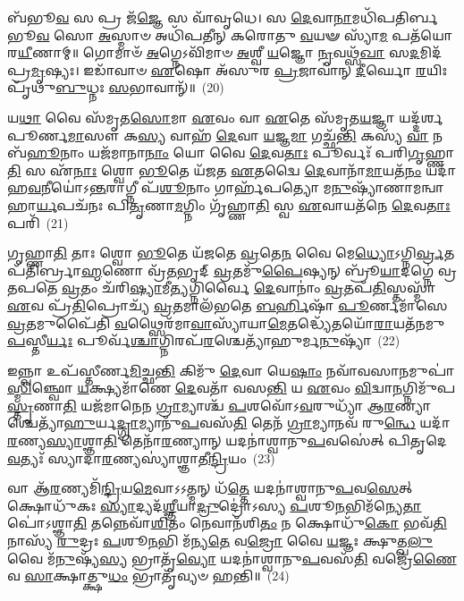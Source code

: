 𑌬᳴𑌭𑍂\-\ul{𑌵} 𑌸 𑌪𑍍𑌰 𑌜᳴\-\ul{𑌜𑍍𑌞𑍇} 𑌸 𑌵𑌾᳴𑌵𑍃𑌧𑍇। 𑌸 \ul{𑌦𑍇}\-𑌵𑌾\-\ul{𑌨𑌾}\-𑌮𑌧𑌿᳴𑌪𑌤𑌿𑌰𑍍𑌬𑌭𑍂\-\ul{𑌵} 𑌸𑍋 \ul{𑌅}\-𑌸𑍍𑌮𑌾𑍞 𑌅𑌧𑌿᳴𑌪𑌤𑍀𑌨𑍍 𑌕𑌰𑍋𑌤𑍁 \ul{𑌵}\-𑌯𑍟 𑌸𑍍𑌯𑌾᳴\-\ul{𑌮} 𑌪𑌤᳴𑌯𑍋 𑌰\-\ul{𑌯𑍀}\-𑌣𑌾𑌮𑍍॥ 𑌗𑍋𑌮𑌾𑍞᳴ \ul{𑌅}\-𑌗𑍍𑌨𑍇\-𑌽𑌵𑌿᳴𑌮𑌾𑍞 \ul{𑌅}\-𑌶𑍍𑌵𑍀 \ul{𑌯}\-𑌜𑍍𑌞𑍋 \ul{𑌨𑍃}\-𑌵𑌥𑍍𑌸᳴\-\ul{𑌖𑌾} 𑌸\-\ul{𑌦}\-𑌮𑌿𑌦᳴𑌪𑍍𑌰\-\ul{𑌮𑍃}\-𑌷𑍍𑌯𑌃। 𑌇𑌡𑌾᳴𑌵𑌾𑍞 \ul{𑌏}\-𑌷𑍋 𑌅᳴𑌸𑍁𑌰 \ul{𑌪𑍍𑌰}\-𑌜𑌾𑌵𑌾॑𑌨𑍍 \ul{𑌦𑍀}\-𑌰𑍍𑌘𑍋 \ul{𑌰}\-𑌯𑌿𑌃 𑌪𑍃᳴𑌥𑍁\-\ul{𑌬𑍁}\-𑌧𑍍𑌨𑌃 \ul{𑌸}\-𑌭𑌾𑌵𑌾𑌨𑍍᳴॥~(20)

{\anuvakamend[{\-\ul{𑌦𑍍𑌵𑌿}\-𑌷𑍍𑌮𑌃 \ul{𑌸𑍁}\-𑌵𑍀\-\ul{𑌰𑍍𑌯}\-\-\ul{𑍞} 𑌸 𑌆 𑌪𑌞𑍍𑌚᳴𑌤𑍍𑌰𑌿𑍞𑌶𑌚𑍍𑌚}]}%

𑌯\-\ul{𑌥𑌾} 𑌵𑍈 𑌸᳴𑌮𑍃𑌤\-\ul{𑌸𑍋}\-𑌮𑌾 \ul{𑌏}\-𑌵𑌂 𑌵𑌾 \ul{𑌏}\-𑌤𑍇 𑌸᳴𑌮𑍃𑌤\-\ul{𑌯}\-𑌜𑍍𑌞𑌾 𑌯𑌦𑍍𑌦᳴𑌰𑍍\mbox{}𑌶𑌪𑍂𑌰𑍍𑌣\-\ul{𑌮𑌾}\-𑌸𑍗 𑌕\-\ul{𑌸𑍍𑌯} 𑌵𑌾𑌹᳴ \ul{𑌦𑍇}\-𑌵𑌾 \ul{𑌯}\-𑌜𑍍𑌞\-\ul{𑌮𑌾} 𑌗𑌚𑍍𑌛᳴\-\ul{𑌨𑍍𑌤𑌿} 𑌕𑌸𑍍𑌯᳴ \ul{𑌵𑌾} 𑌨 𑌬᳴\-\ul{𑌹𑍂}\-𑌨𑌾𑌂 𑌯𑌜᳴𑌮𑌾𑌨𑌾\-\ul{𑌨𑌾𑌂} 𑌯𑍋 𑌵𑍈 \ul{𑌦𑍇}\-𑌵\-\ul{𑌤𑌾𑌃} 𑌪𑍂𑌰𑍍𑌵𑌃᳴ 𑌪𑌰𑌿\-\ul{𑌗𑍃}\-𑌹𑍍𑌣𑌾\-\ul{𑌤𑌿} 𑌸 𑌏᳴\-\ul{𑌨𑌾𑌃} 𑌶𑍍𑌵𑍋 \ul{𑌭𑍂}\-𑌤𑍇 𑌯᳴𑌜𑌤 \ul{𑌏}\-𑌤𑌦𑍍𑌵𑍈 \ul{𑌦𑍇}\-𑌵𑌾𑌨𑌾᳴\-\ul{𑌮𑌾}\-𑌯𑌤᳴\-\ul{𑌨𑌂} 𑌯𑌦𑌾᳴𑌹\-\ul{𑌵}\-𑌨𑍀𑌯𑍋॑\-𑌽\-\ul{𑌨𑍍𑌤}\-𑌰𑌾𑌗𑍍𑌨𑍀 𑌪᳴\-\ul{𑌶𑍂}\-𑌨𑌾𑌂 𑌗𑌾𑌰𑍍\mbox{}𑌹᳴𑌪𑌤𑍍𑌯𑍋 𑌮\-\ul{𑌨𑍁}\-𑌷𑍍𑌯𑌾᳴𑌣𑌾𑌮𑌨𑍍𑌵𑌾𑌹𑌾\-\ul{𑌰𑍍𑌯}\-𑌪𑌚᳴𑌨𑌃 𑌪𑌿\-\ul{𑌤𑍃}\-𑌣𑌾\-\ul{𑌮}\-𑌗𑍍𑌨𑌿𑌂 𑌗𑍃᳴𑌹𑍍𑌣𑌾\-\ul{𑌤𑌿} 𑌸𑍍𑌵 \ul{𑌏}\-𑌵𑌾𑌯𑌤᳴𑌨𑍇 \ul{𑌦𑍇}\-𑌵\-\ul{𑌤𑌾𑌃} 𑌪𑌰𑌿᳴~(21)

𑌗𑍃𑌹𑍍𑌣𑌾\-\ul{𑌤𑌿} 𑌤𑌾𑌃 𑌶𑍍𑌵𑍋 \ul{𑌭𑍂}\-𑌤𑍇 𑌯᳴𑌜𑌤𑍇 \ul{𑌵𑍍𑌰}\-𑌤𑍇\-\ul{𑌨} 𑌵𑍈 𑌮𑍇\-\ul{𑌧𑍍𑌯𑍋}\-\-𑌽𑌗𑍍𑌨𑌿\-\ul{𑌰𑍍𑌵𑍍𑌰}\-𑌤𑌪᳴𑌤𑌿𑌰𑍍𑌬𑍍𑌰𑌾\-\ul{𑌹𑍍𑌮}\-𑌣𑍋 𑌵𑍍𑌰᳴\-\ul{𑌤}\-𑌭𑍃𑌦𑍍 \ul{𑌵𑍍𑌰}\-𑌤𑌮𑍁᳴\-\ul{𑌪𑍈}\-𑌷𑍍𑌯𑌨𑍍 𑌬𑍍𑌰𑍂᳴\-\ul{𑌯𑌾}\-𑌦𑌗𑍍𑌨𑍇॑ 𑌵𑍍𑌰𑌤𑌪𑌤𑍇 \ul{𑌵𑍍𑌰}\-𑌤𑌂 𑌚᳴𑌰𑌿\-\ul{𑌷𑍍𑌯𑌾}\-𑌮𑍀\-\ul{𑌤𑍍𑌯}\-𑌗𑍍𑌨𑌿𑌰𑍍𑌵𑍈 \ul{𑌦𑍇}\-𑌵𑌾𑌨𑌾𑌂॑ \ul{𑌵𑍍𑌰}\-𑌤𑌪᳴\-\ul{𑌤𑌿}\-𑌸𑍍𑌤𑌸𑍍𑌮𑌾᳴ \ul{𑌏}\-𑌵 𑌪𑍍𑌰᳴\-\ul{𑌤𑌿}\-𑌪𑍍𑌰𑍋𑌚𑍍𑌯᳴ \ul{𑌵𑍍𑌰}\-𑌤𑌮𑌾𑌲᳴𑌭𑌤𑍇 \ul{𑌬}\-\-\ul{𑌰𑍍}\-\mbox{}𑌹𑌿𑌷𑌾᳴ \ul{𑌪𑍂}\-𑌰𑍍𑌣𑌮𑌾᳴𑌸𑍇 \ul{𑌵𑍍𑌰}\-𑌤𑌮𑍁𑌪𑍈᳴𑌤𑌿 \ul{𑌵}\-𑌥𑍍𑌸𑍈𑌰᳴𑌮𑌾\-\ul{𑌵𑌾}\-𑌸𑍍𑌯𑌾᳴𑌯𑌾\-\ul{𑌮𑍇}\-𑌤𑌦𑍍𑌧𑍍𑌯𑍇᳴𑌤𑌯𑍋᳴\-\ul{𑌰𑌾}\-𑌯𑌤᳴𑌨𑌮𑍁\-\ul{𑌪}\-𑌸𑍍𑌤𑍀\-\ul{𑌰𑍍𑌯𑌃} 𑌪𑍂𑌰𑍍𑌵᳴\-\ul{𑌶𑍍𑌚𑌾}\-𑌗𑍍𑌨𑌿𑌰𑌪᳴\-\ul{𑌰}\-\-𑌶𑍍𑌚𑍇𑌤𑍍𑌯𑌾᳴𑌹𑍁𑌰𑍍𑌮\-\ul{𑌨𑍁}\-𑌷𑍍𑌯𑌾᳴~(22)

𑌇𑌨𑍍𑌨𑍍𑌵𑌾 𑌉𑌪᳴𑌸𑍍𑌤𑍀𑌰𑍍𑌣\-\ul{𑌮𑌿}\-𑌚𑍍𑌛\-\ul{𑌨𑍍𑌤𑌿} 𑌕𑌿𑌮𑍁᳴ \ul{𑌦𑍇}\-𑌵𑌾 𑌯𑍇\-\ul{𑌷𑌾𑌂} 𑌨𑌵𑌾᳴𑌵𑌸𑌾\-\ul{𑌨}\-\-𑌮𑍁𑌪𑌾॑\-\ul{𑌸𑍍𑌮𑌿}\-𑌞𑍍𑌛𑍍𑌵𑍋 \ul{𑌯}\-𑌕𑍍𑌷𑍍𑌯𑌮𑌾᳴𑌣𑍇 \ul{𑌦𑍇}\-𑌵𑌤𑌾᳴ 𑌵𑌸\-\ul{𑌨𑍍𑌤𑌿} 𑌯 \ul{𑌏}\-𑌵𑌂 \ul{𑌵𑌿}\-𑌦𑍍𑌵𑌾\-\ul{𑌨}\-𑌗𑍍𑌨𑌿𑌮𑍁᳴𑌪\-\ul{𑌸𑍍𑌤𑍃}\-𑌣𑌾\-\ul{𑌤𑌿} 𑌯𑌜᳴𑌮𑌾𑌨𑍇𑌨 \ul{𑌗𑍍𑌰𑌾}\-𑌮𑍍𑌯𑌾𑌶𑍍𑌚᳴ \ul{𑌪}\-𑌶𑌵𑍋᳴\-𑌽\-\ul{𑌵}\-𑌰𑍁𑌧𑍍𑌯𑌾᳴ 𑌆\-\ul{𑌰}\-𑌣𑍍𑌯𑌾𑌶𑍍𑌚𑍇𑌤𑍍𑌯𑌾᳴\-\-\ul{𑌹𑍁}\-𑌰𑍍𑌯\-\ul{𑌦𑍍𑌗𑍍𑌰𑌾}\-𑌮𑍍𑌯𑌾𑌨𑍁᳴\-\ul{𑌪}\-\-𑌵𑌸᳴\-\ul{𑌤𑌿} 𑌤𑍇𑌨᳴ \ul{𑌗𑍍𑌰𑌾}\-𑌮𑍍𑌯𑌾𑌨𑌵᳴ 𑌰𑍁\-\ul{𑌨𑍍𑌧𑍇} 𑌯𑌦𑌾᳴\-\ul{𑌰}\-𑌣𑍍𑌯\-\ul{𑌸𑍍𑌯𑌾}\-𑌶𑍍𑌞𑌾\-\ul{𑌤𑌿} 𑌤𑍇𑌨𑌾᳴\-\ul{𑌰}\-𑌣𑍍𑌯𑌾𑌨𑍍 𑌯𑌦𑌨𑌾॑𑌶𑍍𑌵𑌾𑌨𑍁\-\ul{𑌪}\-𑌵𑌸𑍇॑𑌤𑍍 𑌪𑌿𑌤𑍃𑌦𑍇\-\ul{𑌵}\-𑌤𑍍𑌯𑌃᳴ 𑌸𑍍𑌯𑌾𑌦𑌾\-\ul{𑌰}\-𑌣𑍍𑌯𑌸𑍍𑌯𑌾॑𑌶𑍍𑌞𑌾𑌤𑍀\-\ul{𑌨𑍍𑌦𑍍𑌰𑌿}\-𑌯𑌂~(23)

𑌵𑌾 𑌆᳴\-\ul{𑌰}\-𑌣𑍍𑌯𑌮𑌿᳴\-\ul{𑌨𑍍𑌦𑍍𑌰𑌿}\-𑌯\-\ul{𑌮𑍇}\-𑌵𑌾\-𑌽\-𑌽𑌤𑍍𑌮𑌨𑍍 𑌧᳴\-\ul{𑌤𑍍𑌤𑍇} 𑌯𑌦𑌨𑌾॑𑌶𑍍𑌵𑌾𑌨𑍁\-\ul{𑌪}\-𑌵\-\ul{𑌸𑍇}\-𑌤𑍍 𑌕𑍍𑌷𑍋𑌧𑍁᳴𑌕𑌃 \ul{𑌸𑍍𑌯𑌾}\-𑌦𑍍𑌯𑌦᳴\-\ul{𑌶𑍍𑌞𑍀}\-𑌯𑌾\-\ul{𑌦𑍍𑌰𑍁}\-𑌦𑍍𑌰𑍋॑\-𑌽𑌸𑍍𑌯 \ul{𑌪}\-𑌶𑍂\-\ul{𑌨}\-𑌭𑌿𑌮᳴𑌨𑍍𑌯𑍇\-\ul{𑌤𑌾}\-𑌪𑍋॑\-𑌽𑌶𑍍𑌞𑌾\-\ul{𑌤𑌿} 𑌤𑌨𑍍𑌨𑍇𑌵𑌾᳴\-\ul{𑌶𑌿}\-𑌤𑌂 𑌨𑍇𑌵𑌾𑌨᳴𑌶𑌿\-\ul{𑌤𑌂} 𑌨 𑌕𑍍𑌷𑍋𑌧𑍁᳴\-\ul{𑌕𑍋} 𑌭𑌵᳴\-\ul{𑌤𑌿} 𑌨𑌾𑌸𑍍𑌯᳴ \ul{𑌰𑍁}\-𑌦𑍍𑌰𑌃 \ul{𑌪}\-𑌶𑍂\-\ul{𑌨}\-𑌭𑌿 𑌮᳴𑌨𑍍𑌯\-\ul{𑌤𑍇} 𑌵\-\ul{𑌜𑍍𑌰𑍋} 𑌵𑍈 \ul{𑌯}\-𑌜𑍍𑌞𑌃 𑌕𑍍𑌷𑍁𑌤𑍍𑌖\-\ul{𑌲𑍁} 𑌵𑍈 𑌮᳴\-\ul{𑌨𑍁}\-𑌷𑍍𑌯᳴\-\ul{𑌸𑍍𑌯} 𑌭𑍍𑌰𑌾𑌤𑍃᳴\-\ul{𑌵𑍍𑌯𑍋} 𑌯𑌦𑌨𑌾॑𑌶𑍍𑌵𑌾𑌨𑍁\-\ul{𑌪}\-𑌵𑌸᳴\-\ul{𑌤𑌿} 𑌵𑌜𑍍𑌰𑍇᳴\-\ul{𑌣𑍈}\-𑌵 \ul{𑌸𑌾}\-𑌕𑍍𑌷𑌾𑌤𑍍𑌕𑍍𑌷𑍁\-\ul{𑌧𑌂} 𑌭𑍍𑌰𑌾𑌤𑍃᳴𑌵𑍍𑌯𑍞 𑌹𑌨𑍍𑌤𑌿॥~(24)

